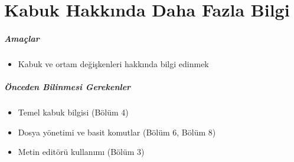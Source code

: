 \chapter{Kabuk Hakkında Daha Fazla Bilgi}
\paragraph{Amaçlar}{
\begin{itemize}
 \item Kabuk ve ortam değişkenleri hakkında bilgi edinmek
 \end{itemize}}
\paragraph{Önceden Bilinmesi Gerekenler}
\begin{itemize}
 \item Temel kabuk bilgisi (Bölüm 4)
 \item Dosya yönetimi ve basit komutlar (Bölüm 6, Bölüm 8)
 \item Metin editörü kullanımı (Bölüm 3)
 \end{itemize}

